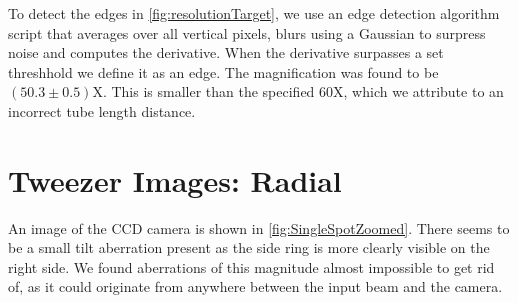 To detect the edges in \cref{fig:resolutionTarget}, we use an edge detection algorithm script that averages over all vertical pixels, blurs using a Gaussian to surpress noise and computes the derivative. 
When the derivative surpasses a set threshhold we define it as an edge.
The magnification was found to be $(50.3\pm0.5)$X.
This is smaller than the specified 60X, which we attribute to an incorrect tube length distance. 

\section{Tweezer Images: Radial}

An image of the CCD camera is shown in \cref{fig:SingleSpotZoomed}. 
There seems to be a small tilt aberration present as the side ring is more clearly visible on the right side. 
We found aberrations of this magnitude almost impossible to get rid of, as it could originate from anywhere between the input beam and the camera.

